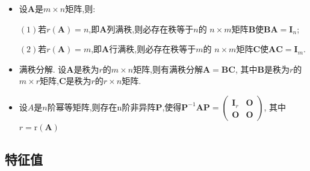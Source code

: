 \documentclass[UTF8]{ctexart}
\begin{document}
\begin{itemize}
	\item 设$\boldsymbol{A}$是$m\times n$矩阵,则:\par
	      $(1)$若$r(\boldsymbol{A})=n$,即$\boldsymbol{A}$列满秩,则必存在秩等于$n$的
	      $n\times m$矩阵$\boldsymbol{B}$使$\boldsymbol{B}\boldsymbol{A}=\boldsymbol{I}_{n}$;\par
	      $(2)$若$r(\boldsymbol{A})=m$,即$\boldsymbol{A}$行满秩,则必存在秩等于$m$的
	      $n\times m$矩阵$\boldsymbol{C}$使$\boldsymbol{AC}=\boldsymbol{I}_{m}$.

	\item 满秩分解.
	      设$\boldsymbol{A}$是秩为$r$的$m\times n$矩阵,则有满秩分解$\boldsymbol{A}=\boldsymbol{B}\boldsymbol{C}$,
	      其中$\boldsymbol{B}$是秩为$r$的$m\times r$矩阵,$\boldsymbol{C}$是秩为$r$的$r\times n$矩阵.

	\item 设$A$是$n$阶幂等矩阵,则存在n阶非异阵$\boldsymbol{P}$,使得$\boldsymbol{P}^{-1} \boldsymbol{A P}=\left(\begin{array}{ll}\boldsymbol{I}_{r} & \boldsymbol{O} \\ \boldsymbol{O} & \boldsymbol{O}\end{array}\right)$,
	      其中$r=\mathrm{r}(\boldsymbol{A})$

\end{itemize}


\subsection{特征值}
\end{document}
